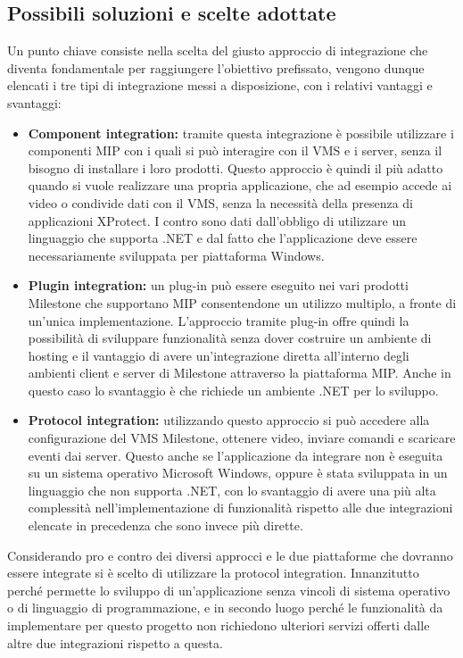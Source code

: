 \documentclass[a4paper, openright, thesis]{report}
\begin{document}
\subsection{Possibili soluzioni e scelte adottate}
Un punto chiave consiste nella scelta del giusto approccio di integrazione che diventa
fondamentale per raggiungere l’obiettivo prefissato, vengono dunque elencati i tre tipi di
integrazione messi a disposizione, con i relativi vantaggi e svantaggi:
\begin{itemize}
    \item \textbf{Component integration:} tramite questa integrazione è possibile utilizzare i componenti MIP con i quali si può interagire con il VMS e i server, senza il bisogno di installare i loro prodotti. Questo approccio è quindi il più adatto quando si vuole realizzare una propria applicazione, che ad esempio accede ai video o condivide dati con il VMS, senza la necessità della presenza di applicazioni XProtect. I contro sono dati dall’obbligo di utilizzare un linguaggio che supporta .NET e dal fatto che l’applicazione deve essere necessariamente sviluppata per piattaforma Windows.
    \item \textbf{Plugin integration:} un plug-in può essere eseguito nei vari prodotti Milestone che supportano MIP
    consentendone un utilizzo multiplo, a fronte di un’unica implementazione. L’approccio tramite plug-in offre quindi la possibilità di sviluppare funzionalità senza dover
    costruire un ambiente di hosting e il vantaggio di avere un’integrazione diretta all'interno degli ambienti client e server di Milestone attraverso la piattaforma MIP. Anche in questo caso lo svantaggio è che richiede un ambiente .NET per lo sviluppo.
    \item \textbf{Protocol integration:} utilizzando questo approccio si può accedere alla configurazione del VMS Milestone, ottenere video, inviare comandi e scaricare eventi dai server. Questo anche se l’applicazione da integrare non è eseguita su un sistema operativo Microsoft Windows, oppure è stata sviluppata in un linguaggio che non supporta .NET, con lo svantaggio di avere una più alta complessità nell’implementazione di funzionalità rispetto alle due integrazioni elencate in precedenza che sono invece più dirette.
\end{itemize}
Considerando pro e contro dei diversi approcci e le due piattaforme che dovranno essere
integrate si è scelto di utilizzare la protocol integration. Innanzitutto perché permette lo sviluppo di un’applicazione senza vincoli di sistema operativo o di linguaggio di programmazione, e in secondo luogo perché le funzionalità da implementare per questo progetto non richiedono
ulteriori servizi offerti dalle altre due integrazioni rispetto a questa.
\end{document}
